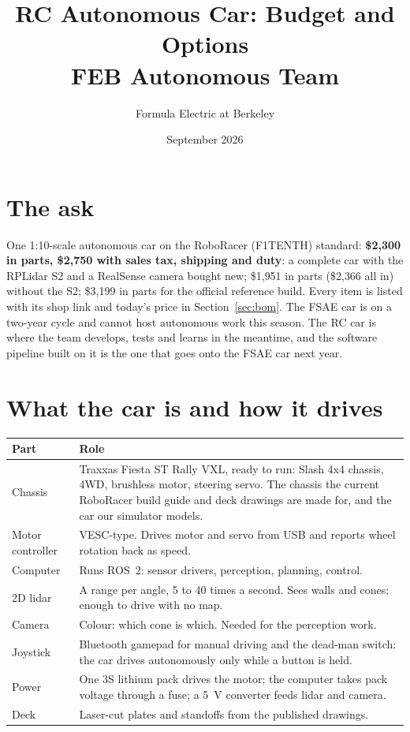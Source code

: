 \documentclass[11pt,a4paper]{article}
\title{\color{febblue}\LARGE RC Autonomous Car: Budget and Options\\[4pt]\large FEB Autonomous Team}
\author{Formula Electric at Berkeley}
\date{September 2026}
\begin{document}
\maketitle

\section*{The ask}

One 1:10-scale autonomous car on the RoboRacer (F1TENTH) standard: \textbf{\$2{,}300 in parts, \$2{,}750 with sales tax, shipping and duty}: a complete car with
the RPLidar S2 and a RealSense camera bought new; \$1{,}951 in parts (\$2{,}366 all in) without the
S2; \$3{,}199 in parts for the official reference build. Every item is listed
with its shop link and today's price in Section~\ref{sec:bom}. The FSAE car is on a two-year cycle and cannot host autonomous work this
season. The RC car is where the team develops, tests and learns in the meantime, and the
software pipeline built on it is the one that goes onto the FSAE car next year.

\section{What the car is and how it drives}

\begin{tabularx}{\linewidth}{lX}
\toprule
Part & Role \\
\midrule
Chassis & Traxxas Fiesta ST Rally VXL, ready to run: Slash 4x4 chassis, 4WD, brushless motor, steering servo. The chassis the current RoboRacer build guide and deck drawings are made for, and the car our simulator models. \\
Motor controller & VESC-type. Drives motor and servo from USB and reports wheel rotation back as speed. \\
Computer & Runs ROS~2: sensor drivers, perception, planning, control. \\
2D lidar & A range per angle, 5 to 40 times a second. Sees walls and cones; enough to drive with no map. \\
Camera & Colour: which cone is which. Needed for the perception work. \\
Joystick & Bluetooth gamepad for manual driving and the dead-man switch: the car drives autonomously only while a button is held. \\
Power & One 3S lithium pack drives the motor; the computer takes pack voltage through a fuse; a 5~V converter feeds lidar and camera. \\
Deck & Laser-cut plates and standoffs from the published drawings. \\
\bottomrule
\end{tabularx}
\end{document}
